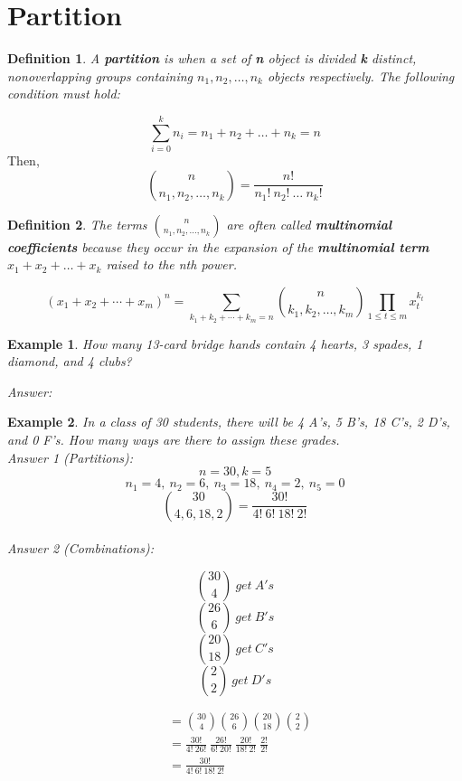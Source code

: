 \documentclass{article}
\newtheorem{defn}{Definition}
\newtheorem{ex}{Example}[defn]
\begin{document}
\section*{Partition}
\begin{defn}
A \textbf{partition} is when a set of \textbf{n} object is divided \textbf{k} distinct, nonoverlapping groups containing $n_1,n_2, \ldots , n_k$ objects respectively. The following condition must hold:
\end{defn}
$${\displaystyle\sum\limits_{i=0}^k n_i}= n_1 + n_2 + \ldots + n_k = n$$
Then,
\begin{equation}
{n \choose n_1,n_2,\ldots,n_k} = \frac{n!}{n_1!\ n_2!\ \ldots\ n_k!}
\end{equation}

\newpage

\begin{defn}
The terms ${n \choose n_1,n_2,\ldots,n_k}$ are often called \textbf{multinomial coefficients} because they occur in the expansion of the \textbf{multinomial term} $x_1 + x_2 + \ldots + x_k$ raised to the nth power.
\end{defn}

\begin{equation}
(x_1 + x_2  + \cdots + x_m)^n = \sum_{k_1+k_2+\cdots+k_m=n} {n \choose k_1, k_2, \ldots, k_m} \prod_{1\leq t\leq m}x_{t}^{k_{t}}
\end{equation}

\begin{ex}
How many 13-card bridge hands contain 4 hearts, 3 spades, 1 diamond, and 4 clubs?

\indent \textit{Answer:} 
\end{ex}

\begin{ex}
In a class of 30 students, there will be 4 A's, 5 B's, 18 C's, 2 D's, and 0 F's. How many ways are there to assign these grades.\\
\indent \textit{Answer 1 (Partitions):} 
$$n = 30, k = 5$$
$$n_1 = 4,\ n_2 = 6,\ n_3 = 18,\ n_4 = 2,\ n_5 = 0$$
$${30 \choose 4,6,18,2} = \frac{30!}{4!\ 6!\ 18!\ 2!}$$
\\
\indent \textit{Answer 2 (Combinations):}
\begin{multicols}{2}
$${30 \choose 4}\ get\ A's$$
$${26 \choose 6}\ get\ B's$$
$${20 \choose 18}\ get\ C's$$
$${2 \choose 2}\ get\ D's$$

\vfill
\columnbreak
$$
\begin{aligned}
& ={30 \choose 4} {26 \choose 6} {20 \choose 18} {2 \choose 2}\\
& =\frac{30!}{4!\ 26!}\ \frac{26!}{6!\ 20!}\ \frac{20!}{18!\ 2!}\ \frac{2!}{2!}\\
& =\frac{30!}{4!\ 6!\ 18!\ 2!}\\
\end{aligned}
$$
\end{multicols}
\end{ex}
\end{document}
